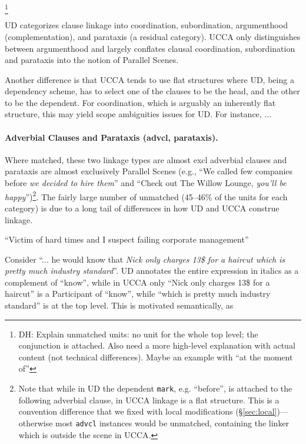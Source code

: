 \documentclass[11pt,a4paper]{article}
\newcommand{\daniel}[1]{\footnote{\color{blue}DH: #1}}
\begin{document}
\daniel{Explain unmatched units: no unit for the whole top level; the conjunction is attached.
Also need a more high-level explanation with actual content (not technical differences).
Maybe an example with ``at the moment of''}

UD categorizes clause linkage into coordination,
subordination, argumenthood (complementation),
and parataxis (a residual category).
UCCA only distinguishes between argumenthood 
and largely conflates clausal coordination, subordination and parataxis into the notion
of Parallel Scenes.

Another difference is that UCCA tends to use flat structures where UD, being a dependency scheme,
has to select one of the clauses to be the head, and the other to be the dependent. For coordination,
which is arguably an inherently flat structure, this may yield scope ambiguities issues for UD. 
For instance, ...


\paragraph{Adverbial Clauses and Parataxis (advcl, parataxis).}
      Where matched, these two linkage types are almost excl adverbial clauses and parataxis are almost exclusively Parallel Scenes
      (e.g., ``We called few companies before \textit{we decided to hire them}''
      and ``Check out The Willow Lounge, \textit{you'll be happy}'')\footnote{Note
      that while in UD the dependent \texttt{mark}, e.g. ``before'',
      is attached to the following adverbial clause,
      in UCCA linkage is a flat structure.
      This is a convention difference that we fixed with local modifications
      (\S\ref{sec:local})---otherwise most \texttt{advcl} instances would be unmatched,
      containing the linker which is outside the scene in UCCA.}.
      The fairly large number of unmatched (45--46\% of the units for each category) is
      due to a long tail of differences in how UD and UCCA construe linkage.
      
      ``Victim of hard times and I suspect failing corporate management''
      
      Consider ``... he would know that {\it Nick only charges 13\$ for a haircut 
      which is pretty much industry standard}''. UD annotates 
      the entire expression in italics as a complement of ``know'', while 
      in UCCA only ``Nick only charges 13\$ for a haircut'' is a Participant of ``know'', while
      ``which is pretty much industry standard'' is at the top level. This is motivated semantically,
      as 
      
\end{document}

